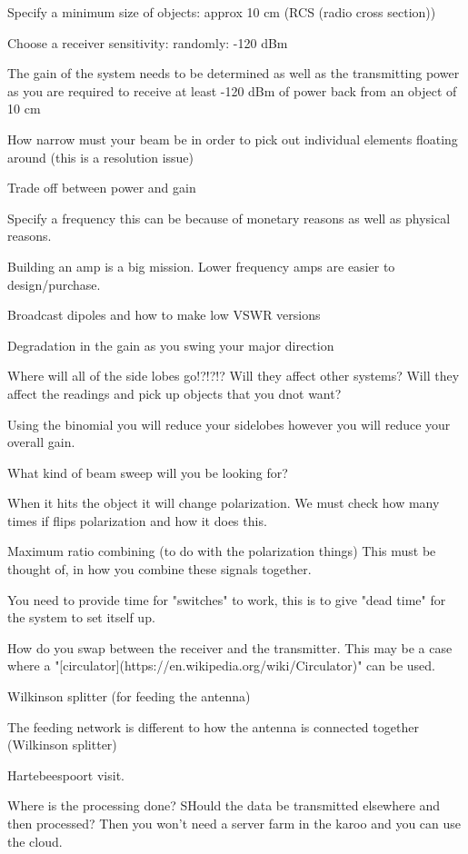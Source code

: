 \documentclass[11pt]{witseiepaper}
\begin{document}
Specify a minimum size of objects: approx 10 cm (RCS (radio cross section))

Choose a receiver sensitivity: randomly: -120 dBm

The gain of the system needs to be determined as well as the transmitting power as you are required to receive at least -120 dBm of power back from an object of 10 cm

How narrow must your beam be in order to pick out individual elements floating around (this is a resolution issue)

Trade off between power and gain

Specify a frequency this can be because of monetary reasons as well as physical reasons.

Building an amp is a big mission. Lower frequency amps are easier to design/purchase.

Broadcast dipoles and how to make low VSWR versions

Degradation in the gain as you swing your major direction

Where will all of the side lobes go!?!?!? Will they affect other systems? Will they affect the readings and pick up objects that you dnot want?

Using the binomial you will reduce your sidelobes however you will reduce your overall gain.

What kind of beam sweep will you be looking for?

When it hits the object it will change polarization. We must check how many times if flips polarization and how it does this.

Maximum ratio combining (to do with the polarization things) This must be thought of, in how you combine these signals together. 

You need to provide time for "switches" to work, this is to give "dead time" for the system to set itself up.

How do you swap between the receiver and the transmitter.
This may be a case where a "[circulator](https://en.wikipedia.org/wiki/Circulator)" can be used.

Wilkinson splitter (for feeding the antenna)

The feeding network is different to how the antenna is connected together (Wilkinson splitter)

Hartebeespoort visit.

Where is the processing done? SHould the data be transmitted elsewhere and then processed? Then you won't need a server farm in the karoo and you can use the cloud.
\end{document}
